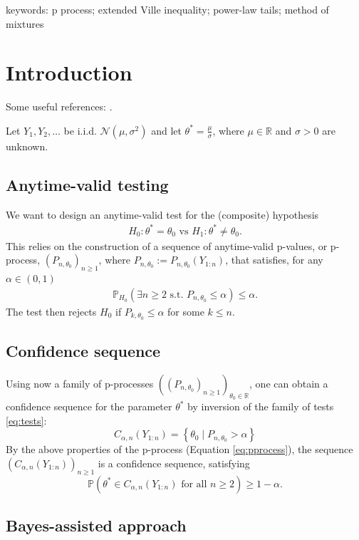 \documentclass{article}%
\begin{document}
keywords: p process; extended Ville inequality; power-law tails; method of mixtures 
\section{Introduction}

Some useful references: \cite{Rouder2009,Lai1976,PerezOrtiz2024,Wang2025,Cortinovis2025}.\medskip

Let $Y_1,Y_2,\ldots$ be i.i.d. $\mathcal N(\mu,\sigma^2)$ and let $\theta^*=\frac{\mu}{\sigma}$, where $\mu\in\mathbb R$ and $\sigma>0$ are unknown. 

\subsection{Anytime-valid testing}

We want to design an anytime-valid test for the (composite) hypothesis 
\begin{align}
H_0:\theta^*=\theta_0 \text{ vs }H_1:\theta^*\neq \theta_0.
\label{eq:tests}
\end{align}
This relies on the construction of a sequence of anytime-valid p-values, or p-process, $(P_{n,\theta_0})_{n\geq 1}$, where $P_{n,\theta_0}:=P_{n,\theta_0}(Y_{1:n})$, that satisfies, for any $\alpha\in (0,1)$
\begin{align}
\mathbb P_{H_0}(\exists n \geq 2 \text{ s.t. } P_{n,\theta_0}\leq \alpha)\leq \alpha.
\label{eq:pprocess}
\end{align}
The test then rejects $H_0$ if $P_{k,\theta_0}\leq \alpha$ for some $k\leq n$. 


\subsection{Confidence sequence}

Using now a family of p-processes $((P_{n,\theta_0})_{n\geq 1})_{\theta_0\in\mathbb R}$, one can obtain a confidence sequence for the parameter $\theta^*$ by inversion of the family of tests \eqref{eq:tests}:
$$
C_{\alpha,n}(Y_{1:n})=\left\{ \theta_0 \mid P_{n,\theta_0}> \alpha\right \}
$$
By the above properties of the p-process (Equation \eqref{eq:pprocess}), the sequence $(C_{\alpha,n}(Y_{1:n}))_{n \geq 1}$ is a confidence sequence, satisfying
$$
\mathbb P(\theta^*  \in C_{\alpha,n}(Y_{1:n}) \text{ for all }n\geq 2)\geq 1-\alpha.
$$


\subsection{Bayes-assisted approach}
\end{document}
